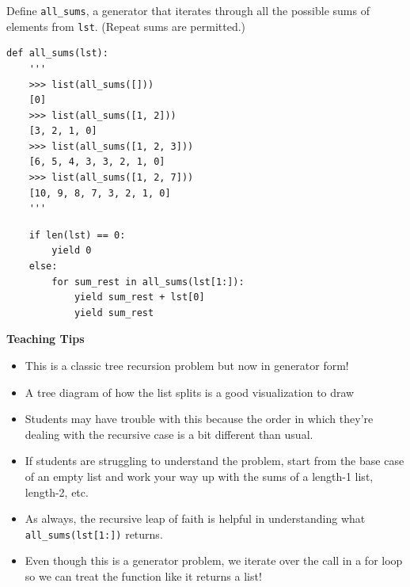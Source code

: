 \begin{blocksection}
\question Define \lstinline$all_sums$, a generator that iterates through all the possible sums of elements from \lstinline$lst$. (Repeat sums are permitted.)
\begin{lstlisting}
def all_sums(lst):
    '''
    >>> list(all_sums([]))
    [0] 
    >>> list(all_sums([1, 2]))
    [3, 2, 1, 0]
    >>> list(all_sums([1, 2, 3]))
    [6, 5, 4, 3, 3, 2, 1, 0]
    >>> list(all_sums([1, 2, 7]))
    [10, 9, 8, 7, 3, 2, 1, 0]
    '''
\end{lstlisting}

\begin{solution}[1.5in]
\begin{lstlisting}
    if len(lst) == 0:
        yield 0
    else:
        for sum_rest in all_sums(lst[1:]):
            yield sum_rest + lst[0]
            yield sum_rest
\end{lstlisting}
\end{solution}
\end{blocksection}

\begin{blocksection}
    \begin{guide}
        \textbf{Teaching Tips}
        \begin{itemize}
            \item This is a classic tree recursion problem but now in generator form!
            \item A tree diagram of how the list splits is a good visualization to draw
            \item Students may have trouble with this because the order in which they're dealing with the recursive case is a bit different than usual.
            \item If students are struggling to understand the problem, start from the base case of an empty list and work your way up with the sums of a length-1 list, length-2, etc.
            \item As always, the recursive leap of faith is helpful in understanding what \lstinline{all_sums(lst[1:])} returns.
            \item Even though this is a generator problem, we iterate over the call in a for loop so we can treat the function like it returns a list!
        \end{itemize}
    \end{guide}
\end{blocksection}
